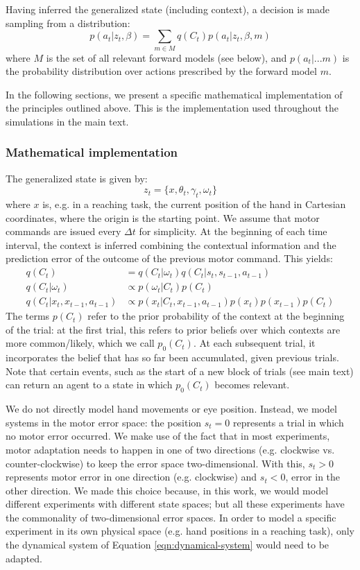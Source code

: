 \documentclass[a4paper,doc,floatsintext,natbib]{apa6}
\def \eref #1{Equation \ref{#1}}   %
\begin{document}
Having inferred the generalized state (including context), a decision is made
sampling from a distribution:
\begin{equation}
p(a_t | z_t, \beta) = \displaystyle\sum_{m \in M}q(C_t)p(a_t | z_t, \beta, m)
\end{equation}
where $M$ is the set of all relevant forward models (see below), and
$p(a_t | ... m)$ is the probability distribution over actions prescribed by the
forward model $m$.

In the following sections, we present a specific mathematical implementation
of the principles outlined above. This is the implementation used throughout the
simulations in the main text.

\subsubsection{Mathematical implementation}
The generalized state is given by:
\begin{equation}
z_t = \{x, \theta_t, \gamma_t, \omega_t\}
\end{equation}
where $x$ is, e.g. in a reaching task, the current position of the hand in
Cartesian coordinates, where the origin is the starting point. We assume that
motor commands are issued every $\Delta t$ for simplicity. At the beginning of
each time interval, the context is inferred combining the contextual
information and the prediction error of the outcome of the previous motor
command. This yields:
\begin{align}
  q(C_t) &= q(C_t | \omega_t)q(C_t | s_t, s_{t-1}, a_{t-1}) \\ \label{eqn:estimated-context}
  q(C_t | \omega_t) &\propto p(\omega_t | C_t)p(C_t) \\
  q(C_t | x_t, x_{t-1}, a_{t-1}) &\propto p(x_t | C_t, x_{t-1}, a_{t-1})p(x_t)p(x_{t-1})p(C_t)
\end{align}
The terms $p(C_t)$ refer to the prior probability of the context at the
beginning of the trial: at the first trial, this refers to prior beliefs over
which contexts are more common/likely, which we call $p_0(C_t)$. At each
subsequent trial, it incorporates the belief that has so far been accumulated,
given previous trials. Note that certain events, such as the start of a new
block of trials (see main text) can return an agent to a state in which
$p_0(C_t)$ becomes relevant.

We do not directly model hand movements or eye position. Instead, we model
systems in the motor error space: the position $s_t = 0$ represents a trial in
which no motor error occurred. We make use of the fact that in most
experiments, motor adaptation needs to happen in one of two directions
(e.g. clockwise vs. counter-clockwise) to keep the error space
two-dimensional. With this, $s_t > 0$ represents motor error in one direction
(e.g. clockwise) and $s_t < 0$, error in the other direction. We made this
choice because, in this work, we would model different experiments with
different state spaces; but all these experiments have the commonality of
two-dimensional error spaces. In order to model a specific experiment in its
own physical space (e.g. hand positions in a reaching task), only the dynamical
system of \eref{eqn:dynamical-system} would need to be adapted.
\end{document}
